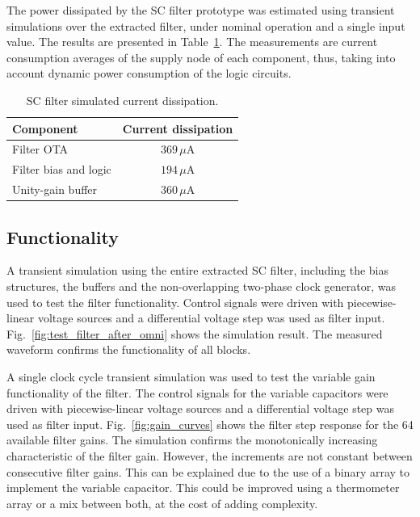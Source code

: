 The power dissipated by the SC filter prototype was estimated using transient simulations over the extracted filter, under nominal operation and a single input value. The results are presented in Table~\ref{tab:power_dissipation}. The measurements are current consumption averages of the supply node of each component, thus, taking into account dynamic power consumption of the logic circuits.  

\begin{table}
	\begin{center}
		\begin{tabular}{|l|c|}\hline
			{\bf Component} & {\bf Current dissipation} \\ \hline\hline
			Filter OTA & $369\,\mu\text{A}$ \\ \hline
			Filter bias and logic & $194\,\mu\text{A}$ \\ \hline
			Unity-gain buffer & $360\,\mu\text{A}$ \\ \hline
		\end{tabular}
		\vspace*{5pt}
		\caption{SC filter simulated current dissipation.}
		\label{tab:power_dissipation}
	\end{center}
\end{table}


\subsection{Functionality} 
A transient simulation using the entire extracted SC filter, including the bias structures, the buffers and the non-overlapping two-phase clock generator, was used to test the filter functionality. Control signals were driven with piecewise-linear voltage sources and a differential voltage step was used as filter input. Fig.~\ref{fig:test_filter_after_omni} shows the simulation result. The measured waveform confirms the functionality of all blocks.

A single clock cycle transient simulation was used to test the variable gain functionality of the filter. The control signals for the variable capacitors were driven with piecewise-linear voltage sources and a differential voltage step was used as filter input. Fig.~\ref{fig:gain_curves} shows the filter step response for the 64 available filter gains. The simulation confirms the monotonically increasing characteristic of the filter gain. However, the increments are not constant between consecutive filter gains. This can be explained due to the use of a binary array to implement the variable capacitor. This could be improved using a thermometer array or a mix between both, at the cost of adding complexity.

